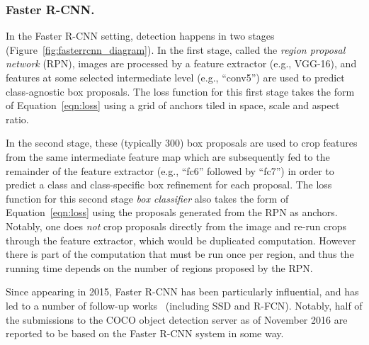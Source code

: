 \documentclass[10pt,twocolumn,letterpaper]{article}
\renewcommand{\paragraph}[1]{\subsubsection{#1}}
\begin{document}
\vspace{-3mm}
\paragraph{Faster R-CNN.}
In the Faster R-CNN setting, detection happens in two stages 
(Figure~\ref{fig:fasterrcnn_diagram}). 
In the first stage, called the \emph{region proposal network} (RPN), images are processed by a feature extractor (e.g., VGG-16), and features at some selected intermediate level (e.g., ``conv5'') are used to predict class-agnostic box proposals.  The loss function for this first stage takes the form of Equation~\ref{eqn:loss} using a grid of anchors tiled in space, scale and aspect ratio.  

In the second stage, these (typically 300) box proposals are used to crop  features from the same intermediate feature map which are subsequently fed to the remainder of the feature extractor (e.g., ``fc6'' followed by ``fc7'') in order to predict a class and class-specific box refinement for each proposal.  The loss function for this second stage \emph{box classifier} also takes the form of Equation~\ref{eqn:loss} using the proposals generated from the RPN as anchors.  Notably, one does \emph{not} crop proposals directly from the image and re-run crops through the feature extractor, which would be duplicated computation.
However there is part of the computation that must be run once per region, and thus the running time depends on the number of regions proposed by the RPN.

Since appearing in 2015, Faster R-CNN has been particularly influential, and has led to a number of follow-up works~\cite{bell2015inside,shrivastava2016training,shrivastava2016contextual,zagoruyko2016multipath,he2015deep,dai2015instance,kim2016pvanet,yang2016craft,lin2016feature,zhai2017visual} (including SSD and R-FCN).  Notably, half of the submissions to the COCO object detection server as of November 2016 are reported to be based on the Faster R-CNN system in some way.
\end{document}
